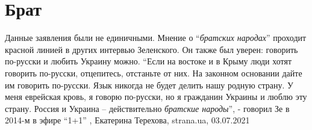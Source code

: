  
 
 
 
 
\chapter{Брат}

Данные заявления были не единичными. Мнение о \enquote{\emph{братских народах}} проходит
красной линией в других интервью Зеленского. Он также был уверен: говорить
по-русски и любить Украину можно. 
\enquote{Если на востоке и в Крыму люди хотят говорить по-русски, отцепитесь, отстаньте
от них. На законном основании дайте им говорить по-русски. Язык никогда не
будет делить нашу родную страну. У меня еврейская кровь, я говорю по-русски, но
я гражданин Украины и люблю эту страну. Россия и Украина – действительно
\emph{братские народы}}, - говорил Зе в 2014-м в эфире \enquote{1+1}
, 
Екатерина Терехова, strana.ua, 03.07.2021
